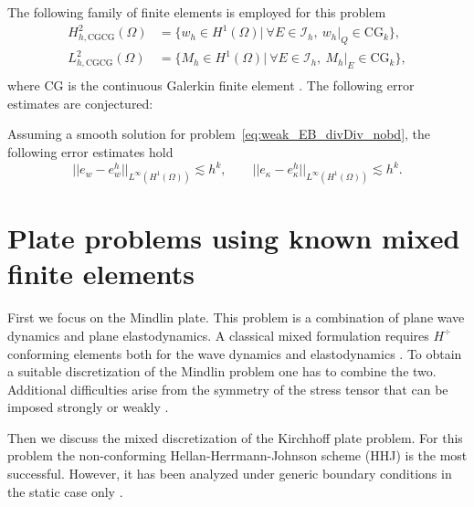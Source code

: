 The following family of finite elements is employed for this problem
\begin{equation}\label{eq:CGCG}
\begin{aligned}
H_{h, \text{CGCG}}^{2}(\Omega) &= \{ w_h \in H^{1}(\Omega) | \ \forall E \in \mathcal{I}_h,\ w_h|_{Q} \in \mathrm{CG}_k \}, \\ 
L_{h, \text{CGCG}}^2(\Omega) &= \{M_h \in H^{1}(\Omega) | \ \forall E \in \mathcal{I}_h, \ M_h|_{E} \in \mathrm{CG}_k \}, \\
\end{aligned}
\end{equation}
where CG is the continuous Galerkin finite element \cite[Chapter 3]{logg2012}.  The following error estimates are conjectured:

\begin{conjecture}\label{conj:CGCGestimates}
	Assuming a smooth solution for problem~\eqref{eq:weak_EB_divDiv_nobd}, the following error estimates hold
	\begin{equation}
	\label{eq:errCGCG}
	||e_w - e_w^h||_{L^{\infty} (H^1(\Omega))} \lesssim h^{k}, \qquad
	||e_\kappa - e_\kappa^h||_{L^{\infty} (H^1(\Omega))} \lesssim h^{k}.
	\end{equation}
\end{conjecture}

\section{Plate problems using known mixed finite elements}

First we focus on the Mindlin plate. This problem is a combination of plane wave dynamics and plane elastodynamics. A classical mixed formulation requires $H^{\div}$ conforming elements both for the wave dynamics \cite{becache2000wave} and elastodynamics \cite{becache2001elas,arnold2014elastodynamics}. To obtain a suitable discretization of the Mindlin problem one has to combine the two. Additional difficulties arise from the symmetry of the stress tensor that can be imposed strongly \cite{becache2001elas} or weakly \cite{arnold2014elastodynamics}.

Then we discuss the mixed discretization of the Kirchhoff plate problem. For this problem the non-conforming Hellan-Herrmann-Johnson scheme \cite{hellan1967,herrmann1967finite,johnson1973convergence} (HHJ) is the most successful. However, it has been analyzed under generic boundary conditions in the static case only \cite{blum1990}. \\


